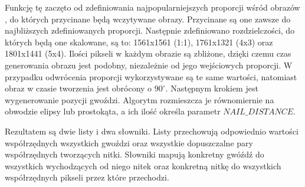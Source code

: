 \documentclass[a4paper, 12pt, polish, twoside]{extreport}
\begin{document}
    Funkcję tę zaczęto od zdefiniowania najpopularniejszych proporcji wśród obrazów \cite{aspect-ratio-youtube}, do których przycinane będą wczytywane obrazy. Przycinane są one zawsze do najbliższych zdefiniowanych proporcji. Następnie zdefiniowano rozdzielczości, do których będą one skalowane, są to: 1561x1561 (1:1), 1761x1321 (4x3) oraz 1801x1441 (5x4). Ilości pikseli w każdym obrazie są zbliżone, dzięki czemu czas generowania obrazu jest podobny, niezależnie od jego wejściowych proporcji. W przypadku odwrócenia proporcji wykorzystywane są te same wartości, natomiast obraz w czasie tworzenia jest obrócony o $90^\circ$. Następnym krokiem jest wygenerowanie pozycji gwoździ. Algorytm rozmieszcza je równomiernie na obwodzie elipsy lub prostokąta, a ich ilość określa parametr \(NAIL\_DISTANCE\). 
    
    Rezultatem są dwie listy i dwa słowniki. Listy przechowują odpowiednio wartości współrzędnych wszystkich gwoździ oraz wszystkie dopuszczalne pary współrzędnych tworzących nitki. Słowniki mapują konkretny gwóźdź do wszystkich wychodzących od niego nitek oraz konkretną nitkę do wszystkich współrzędnych pikseli przez które przechodzi. 
    
\end{document}
